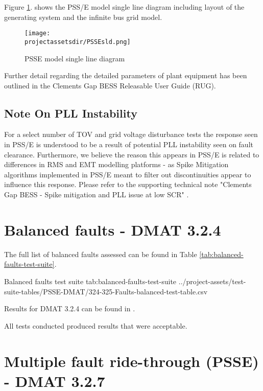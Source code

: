 \documentclass{../grid-link-report}
\newcommand{\projectassetsdir}{../project-assets}
\begin{document}
	Figure \ref{fig:PSSEmodelSLD}. shows the PSS/E model single line diagram including layout of the generating system and the infinite bus grid model.
	
	\begin{figure}[H]
		\centering
		\texttt{[image: \\projectassetsdir/PSSEsld.png]}
		\caption{PSSE model single line diagram}
		\label{fig:PSSEmodelSLD}
	\end{figure}
	
	Further detail regarding the detailed parameters of plant equipment has been outlined in the Clements Gap BESS Releasable User Guide (RUG).
	
	\subsection{Note On PLL Instability}
	\label{foreword on instability}
	
	For a select number of TOV and grid voltage disturbance tests the response seen in PSS/E is understood to be a result of potential PLL instability seen on fault clearance. Furthermore, we believe the reason this appears in PSS/E is related to differences in RMS and EMT modelling platforms - as Spike Mitigation algorithms implemented in PSS/E meant to filter out discontinuities appear to influence this response. Please refer to the supporting technical note "Clements Gap BESS - Spike mitigation and PLL issue at low SCR" \cite{tech-note}.

	
	\section{Balanced faults - DMAT 3.2.4}
	\label{sec:balanced-faults}
	
	
	The full list of balanced faults assessed can be found in Table \ref{tab:balanced-faults-test-suite}.
	
	{
		\fontsize{6}{8}\selectfont
		\autoscaledlongtable
		{Balanced faults test suite}
		{tab:balanced-faults-test-suite}
		{\projectassetsdir/test-suite-tables/PSSE-DMAT/324-325-Faults-balanced-test-table.csv}
	}
	
	Results for DMAT 3.2.4 can be found in .
	
	All tests conducted produced results that were acceptable.
	

	\section{Multiple fault ride-through (PSSE) - DMAT 3.2.7}
	
\end{document}
